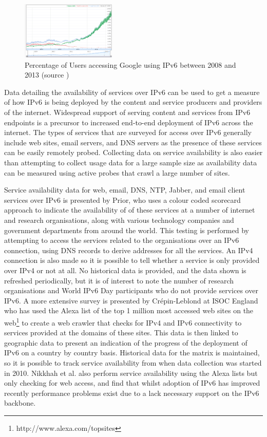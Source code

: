 \begin{figure}[htb]
\centering
\includegraphics[width=0.4\textwidth]{img/v6-google-access.png}
\caption{Percentage of Users accessing Google using IPv6 between 2008 and 2013
(source \protect\cite{google_inc._statistics:_2013})}
\label{fig:google-access}
\end{figure}

Data detailing the availability of services over IPv6 can be used to get a
measure of how IPv6 is being deployed by the content and service producers and
providers of the internet. Widespread support of serving content and services
from IPv6 endpoints is a precursor to increased end-to-end deployment of IPv6
across the internet. The types of services that are surveyed for access over
IPv6 generally include web sites, email servers, and DNS servers
as the presence of these services can be easily remotely probed. Collecting data
on service availability is also easier than attempting to collect usage data
for a large sample size as availability data can be measured using active probes
that crawl a large number of sites.

Service availability data for web, email, DNS, NTP, Jabber, and email client
services over IPv6 is presented by Prior, who uses a colour coded scorecard
approach to indicate the availability of of these services at a number of
internet and research organisations, along with various technology companies and
government departments from around the world\cite{prior_ipv6_2012}. This testing is performed by
attempting to access the services related to the organisations over an IPv6
connection, using DNS records to derive addresses for all the services. An IPv4
connection is also made so it is possible to tell whether a service is only
provided over IPv4 or not at all. No historical data is provided, and the data
shown is refreshed periodically, but it is of interest to note the number of
research organisations and World IPv6 Day participants who do not provide
services over IPv6. A more extensive survey is presented by Crépin-Leblond at
ISOC England who has used the Alexa list of the top 1 million most accessed web
sites on the web\footnote[2]{http://www.alexa.com/topsites}
to create a web crawler that checks for IPv4 and IPv6 connectivity to services provided
at the domains of these sites\cite{olivier_mj_crepin-leblond_ipv6_2010}. This
data is then linked to geographic data to present an indication of the progress
of the deployment of IPv6 on a country by country basis.
Historical data for the matrix is maintained, so it is possible to track service
availability from when data collection was started in 2010. Nikkhah et al. also
perform service availability using the Alexa lists but only checking for
web access, and find that whilst adoption of IPv6 has improved recently
performance problems exist due to a lack necessary support on the IPv6
backbone\cite{nikkhah_assessing_2011}.

